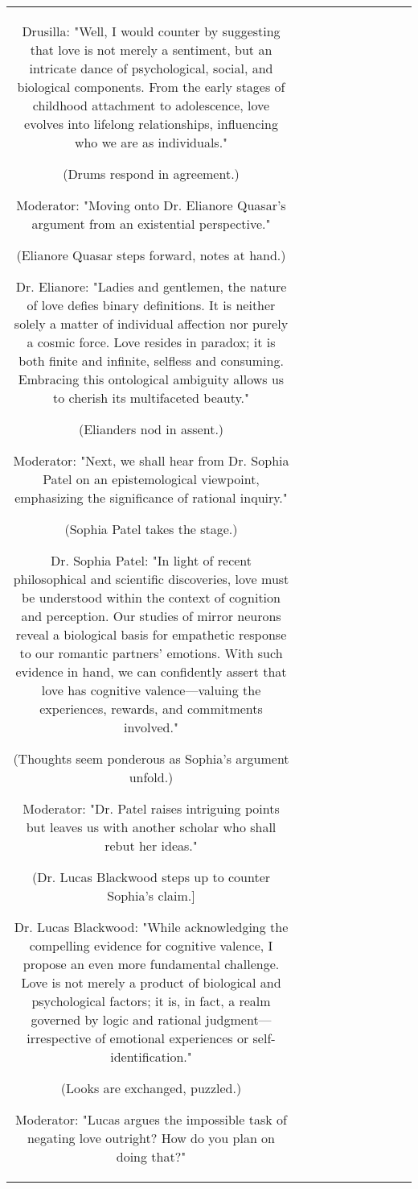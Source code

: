 \begin{table}[h!]
\begin{tabular}{|c|c|c|c|c|c|c|c|c|c|}
Drusilla:
"Well, I would counter by suggesting that love is not merely a sentiment, but an intricate dance of psychological, social, and biological components. From the early stages of childhood attachment to adolescence, love evolves into lifelong relationships, influencing who we are as individuals."

(Drums respond in agreement.)

Moderator:
"Moving onto Dr. Elianore Quasar's argument from an existential perspective."

(Elianore Quasar steps forward, notes at hand.)

Dr. Elianore:
"Ladies and gentlemen, the nature of love defies binary definitions. It is neither solely a matter of individual affection nor purely a cosmic force. Love resides in paradox; it is both finite and infinite, selfless and consuming. Embracing this ontological ambiguity allows us to cherish its multifaceted beauty."

(Elianders nod in assent.)

Moderator:
"Next, we shall hear from Dr. Sophia Patel on an epistemological viewpoint, emphasizing the significance of rational inquiry."

(Sophia Patel takes the stage.)

Dr. Sophia Patel:
"In light of recent philosophical and scientific discoveries, love must be understood within the context of cognition and perception. Our studies of mirror neurons reveal a biological basis for empathetic response to our romantic partners' emotions. With such evidence in hand, we can confidently assert that love has cognitive valence—valuing the experiences, rewards, and commitments involved."

(Thoughts seem ponderous as Sophia's argument unfold.)

Moderator:
"Dr. Patel raises intriguing points but leaves us with another scholar who shall rebut her ideas."

(Dr. Lucas Blackwood steps up to counter Sophia's claim.]

Dr. Lucas Blackwood:
"While acknowledging the compelling evidence for cognitive valence, I propose an even more fundamental challenge. Love is not merely a product of biological and psychological factors; it is, in fact, a realm governed by logic and rational judgment—irrespective of emotional experiences or self-identification."

(Looks are exchanged, puzzled.)

Moderator:
"Lucas argues the impossible task of negating love outright? How do you plan on doing that?"


\end{tabular}
\end{table}
